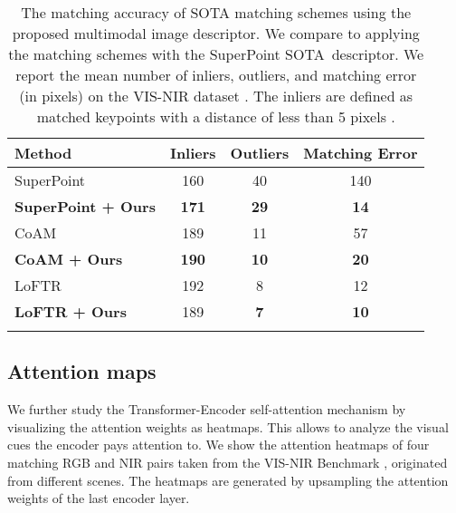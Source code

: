 \documentclass[10pt,journal]{IEEEtran}\usepackage{amsfonts}
\begin{document}
\begin{table*}[tbh]
\centering
\par
\begin{tabular}{lccc}
\toprule Method & Inliers & Outliers & \makecell{Matching Error\\ } \\
\midrule SuperPoint\cite{SuperPoint} & 160 & 40 & 140 \\
\textbf{SuperPoint\cite{SuperPoint} + Ours} & \textbf{171} & \textbf{29} &
\textbf{14} \\
CoAM\cite{CoAM} & 189 & 11 & 57 \\
\textbf{CoAM\cite{CoAM} + Ours} & \textbf{190} & \textbf{10} & \textbf{20}
\\
LoFTR\cite{LoFTR} & 192 & 8 & 12 \\
\textbf{LoFTR\cite{LoFTR} + Ours} & 189 & \textbf{7} & \textbf{10} \\
\bottomrule &  &  &
\end{tabular}\caption{The matching accuracy of SOTA matching schemes using the proposed
multimodal image descriptor. We compare to applying the matching schemes
with the SuperPoint \protect\cite{SuperPoint} SOTA\ descriptor. We report
the mean number of inliers, outliers, and matching error (in pixels) on the
VIS-NIR dataset \protect\cite{SiameseCrossSpectral}. The inliers are defined
as matched keypoints with a distance of less than 5 pixels \protect\cite {multisensor}.}
\label{tab:image_matching}
\end{table*}

\subsection{Attention maps}

\label{subsec:Attention maps}

We further study the Transformer-Encoder self-attention mechanism by
visualizing the attention weights as heatmaps. This allows to analyze the
visual cues the encoder pays attention to. We show the attention heatmaps of
four matching RGB and NIR pairs taken from the VIS-NIR Benchmark \cite {SiameseCrossSpectral}, originated from different scenes. The heatmaps are
generated by upsampling the attention weights of the last encoder layer.
\end{document}
